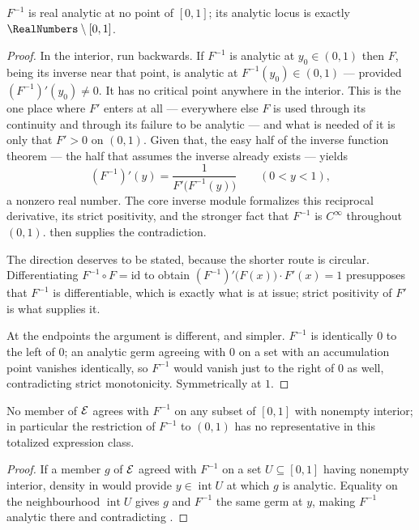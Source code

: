 \begin{theorem}\label{ne:thm:invnowhere}
$F^{-1}$ is real analytic at no point of $[0,1]$; its analytic locus is
exactly $\RealNumbers\setminus[0,1]$.
\end{theorem}

\begin{proof}
In the interior, run  backwards.  If $F^{-1}$ is analytic at
$y_0\in(0,1)$ then $F$, being its inverse near that point, is analytic at
$F^{-1}(y_0)\in(0,1)$ --- provided $(F^{-1})'(y_0)\ne0$.  It has no critical
point anywhere in the interior.  This is the one place where $F'$ enters at
all --- everywhere else
$F$ is used through its continuity and through its failure to be analytic ---
and what is needed of it is only that $F'>0$ on $(0,1)$.  Given that, the easy
half of the inverse function theorem --- the half that assumes the inverse
already exists --- yields
 \[
   (F^{-1})'(y)=\frac{1}{F'\bigl(F^{-1}(y)\bigr)}\qquad(0<y<1),
 \]
 a nonzero real number.  The core inverse module formalizes this reciprocal
 derivative, its strict positivity, and the stronger fact that $F^{-1}$ is
 $C^\infty$ throughout $(0,1)$.   then supplies the
 contradiction.

The direction deserves to be stated, because the shorter route is circular.
Differentiating $F^{-1}\circ F=\mathrm{id}$ to obtain
$(F^{-1})'\bigl(F(x)\bigr)\cdot F'(x)=1$ presupposes that $F^{-1}$ is
differentiable, which is exactly what is at issue; strict positivity of $F'$
is what supplies it.

At the endpoints the argument is different, and simpler.  $F^{-1}$ is
identically $0$ to the left of $0$; an analytic germ agreeing with $0$ on a
set with an accumulation point vanishes identically, so $F^{-1}$ would vanish
just to the right of $0$ as well, contradicting strict monotonicity.
Symmetrically at $1$.
\end{proof}

\begin{corollary}\label{ne:cor:invmain}
No member of $\mathcal E$ agrees with $F^{-1}$ on any subset of $[0,1]$ with
nonempty interior; in particular the restriction of $F^{-1}$ to $(0,1)$ has
no representative in this totalized expression class.
\end{corollary}

\begin{proof}
If a member $g$ of $\mathcal E$ agreed with $F^{-1}$ on a set $U\subseteq[0,1]$
having nonempty interior, density in  would provide
$y\in\operatorname{int}U$ at which $g$ is analytic.  Equality on the
neighbourhood $\operatorname{int}U$ gives $g$ and $F^{-1}$ the same germ at
$y$, making $F^{-1}$ analytic there and contradicting
.
\end{proof}

